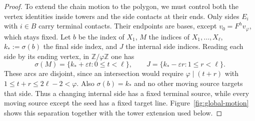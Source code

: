 \documentclass[11pt,a4paper]{article}
\newcommand{\Z}{\mathbb Z}
\theoremstyle{definition}
\theoremstyle{remark}
\numberwithin{equation}{section}
\begin{document}
\begin{proof}
To extend the chain motion to the polygon, we must control both the
vertex identities inside towers and the side contacts at their ends.
Only sides $E_i$ with $i\in B$ carry terminal contacts.  Their endpoints
are bases, except $v_0=F^hv_\varphi$, which stays fixed.
Let $b$ be the index of $X_1$, $M$ the indices of $X_1,\ldots,X_\ell$,
$k_*:=\sigma(b)$ the final side index, and $J$ the internal side indices.
Reading each side by its ending vertex, in $\Z/\varphi\Z$ one has
\begin{equation}\label{eq:network-disjointness}
 \sigma(M)=\{k_*+\varepsilon t:0\le t<\ell\},\qquad
 J=\{k_*-\varepsilon r:1\le r<\ell\}.
\end{equation}
These arcs are disjoint, since an intersection would require
$\varphi\mid(t+r)$ with $1\le t+r\le2\ell-2<\varphi$.
Also $\sigma(b)=k_*$ and no other moving source targets that side.
Thus a changing internal side has a fixed terminal source, while every
moving source except the seed has a fixed target line.  Figure~\ref{fig:global-motion}
shows this separation together with the tower extension used below.


\end{proof}
\end{document}
